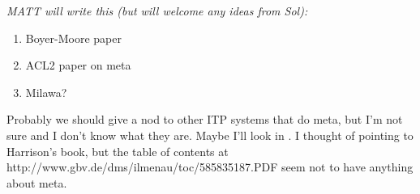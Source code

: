 {\it \color{red} MATT will write this (but will welcome any ideas from
  Sol):

\begin{enumerate}

\item Boyer-Moore paper~\cite{meta}
\item ACL2 paper on meta~\cite{meta-05}
\item Milawa?~\cite{davis09}

\end{enumerate}

Probably we should give a nod to other ITP systems that do meta, but
I'm not sure and I don't know what they are.  Maybe I'll look in
\cite{meta-05}.  I thought of pointing to Harrison's book, but the
table of contents at http://www.gbv.de/dms/ilmenau/toc/585835187.PDF
seem not to have anything about meta.


}

